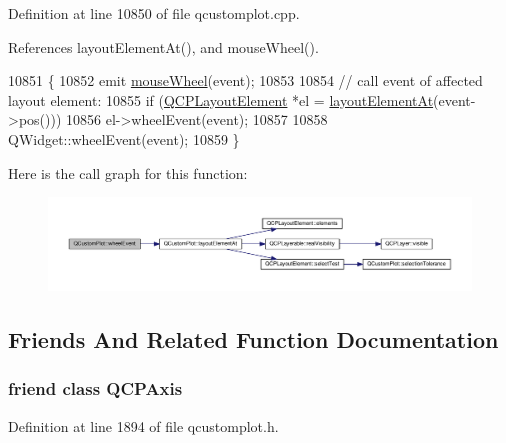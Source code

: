 Definition at line 10850 of file qcustomplot.\+cpp.



References layout\+Element\+At(), and mouse\+Wheel().


\begin{DoxyCode}
10851 \{
10852   emit \hyperlink{class_q_custom_plot_ac80a14206f99304a91d2aa55775ec3ff}{mouseWheel}(event);
10853   
10854   \textcolor{comment}{// call event of affected layout element:}
10855   \textcolor{keywordflow}{if} (\hyperlink{class_q_c_p_layout_element}{QCPLayoutElement} *el = \hyperlink{class_q_custom_plot_a840458186d4483c8a42d6a399448d38f}{layoutElementAt}(event->pos()))
10856     el->wheelEvent(event);
10857   
10858   QWidget::wheelEvent(event);
10859 \}
\end{DoxyCode}


Here is the call graph for this function\+:\nopagebreak
\begin{figure}[H]
\begin{center}
\leavevmode
\includegraphics[width=350pt]{class_q_custom_plot_a7b8bd7e8d3a1d23a8595e9c6a6b76ef1_cgraph}
\end{center}
\end{figure}




\subsection{Friends And Related Function Documentation}
\hypertarget{class_q_custom_plot_af123edeca169ec7a31958a1d714e1a8a}{}
\subsubsection[{Q\+C\+P\+Axis}]{\setlength{\rightskip}{0pt plus 5cm}friend class {\bf Q\+C\+P\+Axis}\hspace{0.3cm}{\ttfamily [friend]}}\label{class_q_custom_plot_af123edeca169ec7a31958a1d714e1a8a}


Definition at line 1894 of file qcustomplot.\+h.

\hypertarget{class_q_custom_plot_acbf20ecb140f66c5fd1bc64ae0762990}{}
